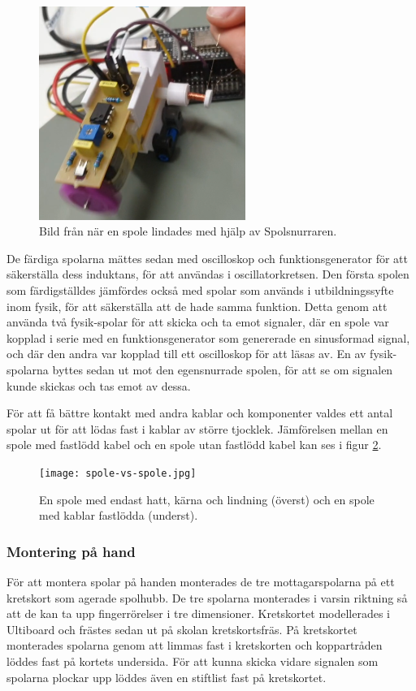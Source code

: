 \documentclass[a4paper]{article}
\begin{document}
\begin{sloppypar}
  \begin{figure}[H]
    \centering
    \includegraphics[width=0.6\textwidth]{spolsnurrare1.png}
    \caption{Bild från när en spole lindades med hjälp av Spolsnurraren.}
    \label{fig:Spolsnurrare}
  \end{figure}

  De färdiga spolarna mättes sedan med oscilloskop och funktionsgenerator för att säkerställa dess induktans, för att användas i oscillatorkretsen.
  Den första spolen som färdigställdes jämfördes också med spolar som används i utbildningssyfte inom fysik, för att säkerställa att de hade samma funktion.
  Detta genom att använda två fysik-spolar för att skicka och ta emot signaler, där en spole var kopplad i serie med en funktionsgenerator som genererade en sinusformad signal, och där den andra var kopplad till ett oscilloskop för att läsas av.
  En av fysik-spolarna byttes sedan ut mot den egensnurrade spolen, för att se om signalen kunde skickas och tas emot av dessa.

  För att få bättre kontakt med andra kablar och komponenter valdes ett antal spolar ut för att lödas fast i kablar av större tjocklek.
  Jämförelsen mellan en spole med fastlödd kabel och en spole utan fastlödd kabel kan ses i figur \ref{fig:SpoleVsSpole}.

  \begin{figure}[H]
    \centering
    \texttt{[image: spole-vs-spole.jpg]}
    \caption{En spole med endast hatt, kärna och lindning (överst) och en spole med kablar fastlödda (underst).}
    \label{fig:SpoleVsSpole}
  \end{figure}


  \subsubsection{Montering på hand} %
  För att montera spolar på handen monterades de tre mottagarspolarna på ett kretskort som agerade spolhubb.
  De tre spolarna monterades i varsin riktning så att de kan ta upp fingerrörelser i tre dimensioner.
  Kretskortet modellerades i Ultiboard och frästes sedan ut på skolan kretskortsfräs.
  På kretskortet monterades spolarna genom att limmas fast i kretskorten och koppartråden löddes fast på kortets undersida.
  För att kunna skicka vidare signalen som spolarna plockar upp löddes även en stiftlist fast på kretskortet.



\end{sloppypar}
\end{document}
